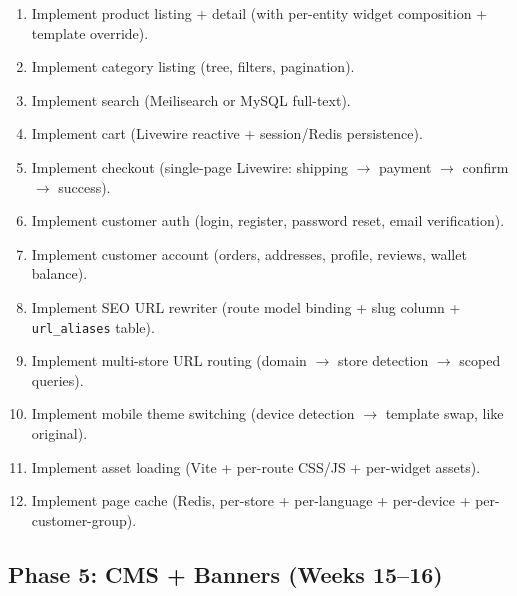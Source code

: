 \documentclass[11pt,a4paper]{article}
\begin{document}
\begin{enumerate}[leftmargin=1.6em,itemsep=2pt]
  \item Implement product listing + detail (with per-entity widget
        composition + template override).
  \item Implement category listing (tree, filters, pagination).
  \item Implement search (Meilisearch or MySQL full-text).
  \item Implement cart (Livewire reactive + session/Redis persistence).
  \item Implement checkout (single-page Livewire: shipping $\to$
        payment $\to$ confirm $\to$ success).
  \item Implement customer auth (login, register, password reset,
        email verification).
  \item Implement customer account (orders, addresses, profile,
        reviews, wallet balance).
  \item Implement SEO URL rewriter (route model binding + slug
        column + \texttt{url\_aliases} table).
  \item Implement multi-store URL routing (domain $\to$ store
        detection $\to$ scoped queries).
  \item Implement mobile theme switching (device detection $\to$
        template swap, like original).
  \item Implement asset loading (Vite + per-route CSS/JS + per-widget
        assets).
  \item Implement page cache (Redis, per-store + per-language +
        per-device + per-customer-group).
\end{enumerate}

\subsection{Phase 5: CMS + Banners (Weeks 15--16)}
\end{document}
